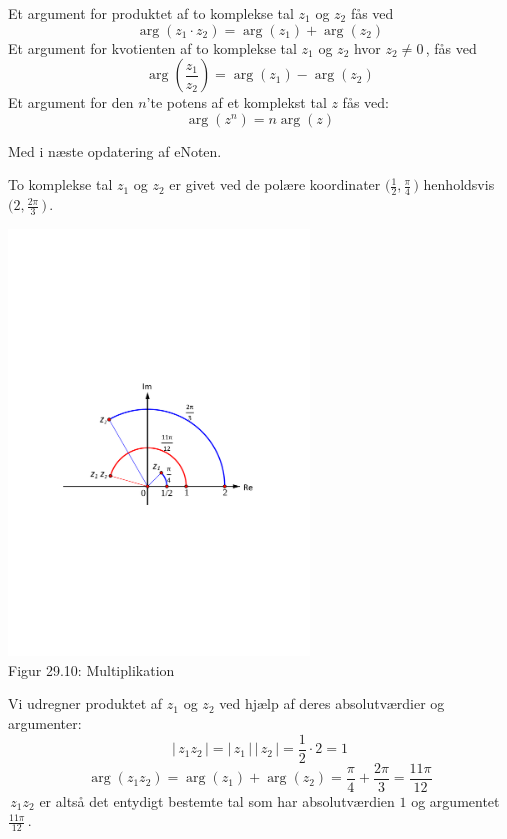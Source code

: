 \begin{theorem}\label{tn29_RegnArg}
Et argument for produktet af to komplekse tal $z_1$ og $z_2$ fås ved
\begin{equation}\label{tn29_RegnArg1}
\arg(z_1\cdot z_2)=\arg(z_1)+\arg(z_2)
\end{equation}
Et argument for kvotienten af to komplekse tal $z_1$ og $z_2$ hvor $z_2\neq 0\,$, fås ved
\begin{equation}\label{tn29_RegnArg2}
\arg\left(\frac{z_1}{z_2}\right)=\arg(z_1)-\arg(z_2)
\end{equation}
Et argument for den $n$'te potens af et  komplekst tal $z$ fås ved:
\begin{equation}\label{tn29_RegnArg3}
\arg(z^n)=n\arg(z)
\end{equation}
\end{theorem}
\begin{bevis}
Med i næste opdatering af eNoten.
\end{bevis}

\begin{example}\label{PolarMult}
To komplekse tal $z_1$ og $z_2$ er givet ved de polære koordinater $\big(\frac 12,\frac{\pi}4\,\big)$ henholdsvis $\big(2,\frac{2\pi}3\,\big)\,$.
\begin{center}
	\includegraphics[trim=3cm 10cm 3cm 12cm,width=0.6\textwidth,clip]{Geometer/multiplikation.pdf}\\
Figur 29.10: Multiplikation 
\end{center}
 Vi udregner produktet af $z_1$ og $z_2$ ved hjælp af deres absolutværdier og argumenter:
$$|\,z_1z_2\,|=|\,z_1\,|\,|\,z_2\,|=\frac12\cdot2=1$$
$$\arg(z_1z_2)=\arg(z_1)+\arg(z_2)=\frac{\pi}{4}+\frac{2\pi}{3}=\frac{11\pi}{12}$$
$\,z_1z_2$ er altså det entydigt bestemte tal som har absolutværdien $1$ og argumentet $\frac{11\pi}{12}\,.$
\end{example}
 
